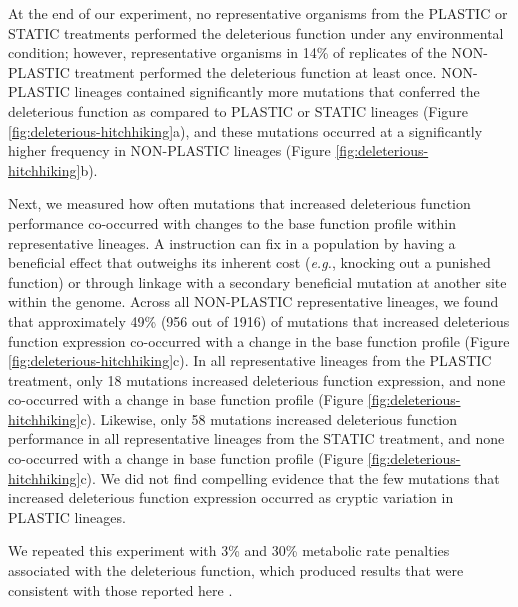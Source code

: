 \documentclass[utf8]{frontiersSCNS} %
\begin{document}
\begin{raggedbottom}
At the end of our experiment, no representative organisms from the PLASTIC or STATIC treatments performed the deleterious function under any environmental condition; however, representative organisms in 14\% of replicates of the NON-PLASTIC treatment performed the deleterious function at least once.
NON-PLASTIC lineages contained significantly more mutations that conferred the deleterious function as compared to PLASTIC or STATIC lineages (Figure \ref{fig:deleterious-hitchhiking}a), and these mutations occurred at a significantly higher frequency in NON-PLASTIC lineages (Figure \ref{fig:deleterious-hitchhiking}b).

Next, we measured how often mutations that increased deleterious function performance co-occurred with changes to the base function profile within representative lineages.
A  instruction can fix in a population by having a beneficial effect that outweighs its inherent cost (\textit{e.g.}, knocking out a punished function) or through linkage with a secondary beneficial mutation at another site within the genome.
Across all NON-PLASTIC representative lineages, we found that approximately 49\% (956 out of 1916) of mutations that increased deleterious function expression co-occurred with a change in the base function profile (Figure \ref{fig:deleterious-hitchhiking}c).
In all representative lineages from the PLASTIC treatment, only 18 mutations increased deleterious function expression, and none co-occurred with a change in base function profile (Figure \ref{fig:deleterious-hitchhiking}c).
Likewise, only 58 mutations increased deleterious function performance in all representative lineages from the STATIC treatment, and none co-occurred with a change in base function profile (Figure \ref{fig:deleterious-hitchhiking}c).
We did not find compelling evidence that the few mutations that increased deleterious function expression occurred as cryptic variation in PLASTIC lineages.

We repeated this experiment with 3\% and 30\% metabolic rate penalties associated with the deleterious function, which produced results that were consistent with those reported here \citep{supplemental_material}.




\end{raggedbottom}
\end{document}
